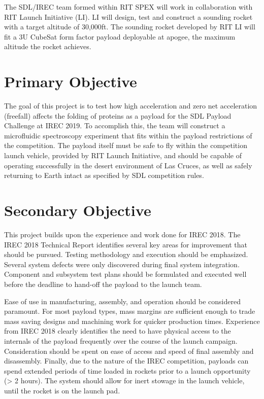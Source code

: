 \documentclass[conference]{IEEEtran} %
\begin{document}
The SDL/IREC team formed within RIT SPEX will work in collaboration with RIT Launch Initiative (LI). LI will design, test and construct a sounding rocket with a target altitude of 30,000ft. The sounding rocket developed by RIT LI will fit a 3U CubeSat form factor payload deployable at apogee, the maximum altitude the rocket achieves. 


\section{Primary Objective}
\label{sec:primary-obj}

The goal of this project is to test how high acceleration and zero net acceleration (freefall) affects the folding of proteins as a payload for the SDL Payload Challenge at IREC 2019. To accomplish this, the team will construct a microfluidic spectroscopy experiment that fits within the payload restrictions of the competition. The payload itself must be safe to fly within the competition launch vehicle, provided by RIT Launch Initiative, and should be capable of operating successfully in the desert environment of Las Cruces, as well as safely returning to Earth intact as specified by SDL competition rules.

\section{Secondary Objective}
\label{sec:secondary-obj}

This project builds upon the experience and work done for IREC 2018. The  IREC 2018 Technical Report identifies several key areas for improvement that should be pursued. Testing methodology and execution should be emphasized. Several system defects were only discovered during final system integration. Component and subsystem test plans should be formulated and executed well before the deadline to hand-off the payload to the launch team.

Ease of use in manufacturing, assembly, and operation should be considered paramount. For most payload types, mass margins are sufficient enough to trade mass saving designs and machining work for quicker production times. Experience from IREC 2018 clearly identifies the need to have physical access to the internals of the payload frequently over the course of the launch campaign. Consideration should be spent on ease of access and speed of final assembly and disassembly. Finally, due to the nature of the IREC competition, payloads can spend extended periods of time loaded in rockets prior to a launch opportunity (> 2 hours). The system should allow for inert stowage in the launch vehicle, until the rocket is on the launch pad.
\end{document}
